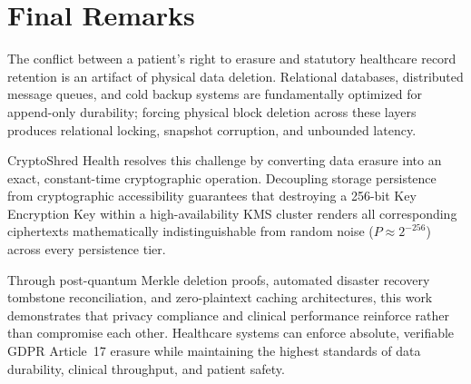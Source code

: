 
\section{Final Remarks}\label{section:final-remarks}

The conflict between a patient's right to erasure and statutory healthcare record retention is an artifact of physical data deletion. Relational databases, distributed message queues, and cold backup systems are fundamentally optimized for append-only durability; forcing physical block deletion across these layers produces relational locking, snapshot corruption, and unbounded latency.

CryptoShred Health resolves this challenge by converting data erasure into an exact, constant-time cryptographic operation. Decoupling storage persistence from cryptographic accessibility guarantees that destroying a 256-bit Key Encryption Key within a high-availability KMS cluster renders all corresponding ciphertexts mathematically indistinguishable from random noise ($P \approx 2^{-256}$) across every persistence tier. 

Through post-quantum Merkle deletion proofs, automated disaster recovery tombstone reconciliation, and zero-plaintext caching architectures, this work demonstrates that privacy compliance and clinical performance reinforce rather than compromise each other. Healthcare systems can enforce absolute, verifiable GDPR Article~17 erasure while maintaining the highest standards of data durability, clinical throughput, and patient safety.
